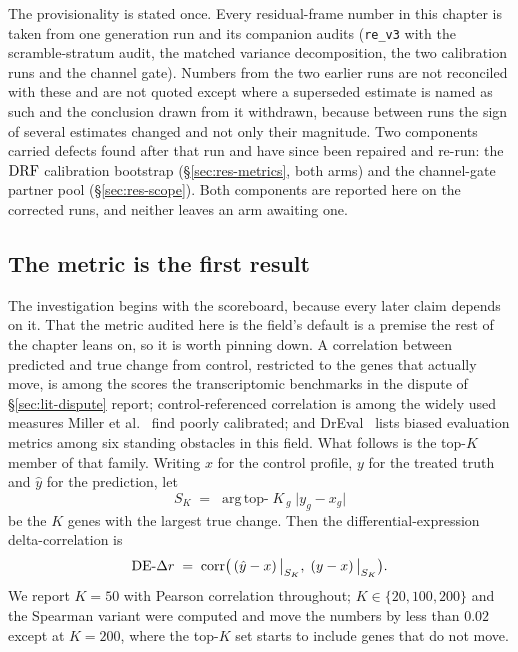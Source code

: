 The provisionality is stated once. Every residual-frame number in this chapter is taken from one
generation run and its companion audits (\texttt{re\_v3} with the scramble-stratum audit, the
matched variance decomposition, the two calibration runs and the channel gate). Numbers from the
two earlier runs are not reconciled with these and are not quoted except where a superseded
estimate is named as such and the conclusion drawn from it withdrawn, because between runs the sign
of several estimates changed and not only their magnitude. Two components carried defects found
after that run and have since been repaired and re-run: the $\textrm{DRF}$ calibration bootstrap
(\S\ref{sec:res-metrics}, both arms) and the channel-gate partner pool
(\S\ref{sec:res-scope}). Both components are reported here on the corrected runs, and neither
leaves an arm awaiting one.

\subsection{The metric is the first result}
\label{sec:methods-metrics}
\label{sec:res-metrics}

The investigation begins with the scoreboard, because every later claim depends on it. That the
metric audited here is the field's default is a premise the rest of the chapter leans on, so it is
worth pinning down. A correlation between predicted and true change from control, restricted to the
genes that actually move, is among the scores the transcriptomic benchmarks in the dispute of
\S\ref{sec:lit-dispute} report; control-referenced correlation is among the widely used measures
Miller et al.~\cite{miller} find poorly calibrated; and DrEval~\cite{dreval} lists biased evaluation
metrics among six standing obstacles in this field. What follows is the top-$K$ member of that
family. Writing $x$ for the control profile, $y$ for the treated truth and
$\hat{y}$ for the prediction, let
\begin{equation}
 S_K \;=\; \operatorname*{arg\,top-}K_{\,g} \; \lvert y_g - x_g \rvert
\end{equation}
be the $K$ genes with the largest true change. Then the differential-expression delta-correlation is
\begin{equation}
 \textrm{DE-}\Delta r \;=\; \operatorname{corr}\!\big( \left(\hat{y} - x\right)\big|_{S_K}, \;
 \left(y - x\right)\big|_{S_K} \big).
\end{equation}
We report $K=50$ with Pearson correlation throughout; $K \in \{20, 100, 200\}$ and the Spearman
variant were computed and move the numbers by less than $0.02$ except at $K=200$, where the top-$K$
set starts to include genes that do not move.

